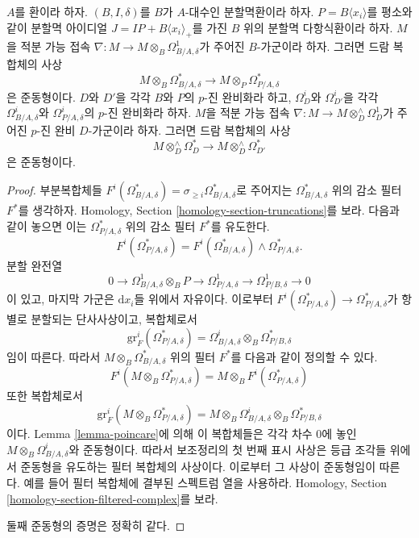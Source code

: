 \begin{lemma}
\label{lemma-relative-poincare}
$A$를 환이라 하자. $(B, I, \delta)$를 $B$가 $A$-대수인 분할멱환이라
하자. $P = B\langle x_i \rangle$를 평소와 같이 분할멱 아이디얼
$J = IP + B\langle x_i \rangle_{+}$를 가진 $B$ 위의 분할멱
다항식환이라 하자. $M$을 적분 가능 접속
$\nabla : M \to M \otimes_B \Omega^1_{B/A, \delta}$가 주어진
$B$-가군이라 하자. 그러면 드람 복합체의 사상
$$
M \otimes_B \Omega^*_{B/A, \delta}
\longrightarrow
M \otimes_P \Omega^*_{P/A, \delta}
$$
은 준동형이다. $D$와 $D'$을 각각 $B$와 $P$의 $p$-진 완비화라
하고, $\Omega^i_D$와 $\Omega^i_{D'}$을 각각
$\Omega^i_{B/A, \delta}$와 $\Omega^i_{P/A, \delta}$의 $p$-진
완비화라 하자. $M$을
적분 가능 접속 $\nabla : M \to M \otimes^\wedge_D \Omega^1_D$가
주어진 $p$-진 완비 $D$-가군이라 하자. 그러면 드람 복합체의 사상
$$
M \otimes^\wedge_D \Omega^*_D
\longrightarrow
M \otimes^\wedge_D \Omega^*_{D'}
$$
은 준동형이다.
\end{lemma}

\begin{proof}
부분복합체들
$F^i(\Omega^*_{B/A, \delta}) = \sigma_{\geq i}\Omega^*_{B/A, \delta}$로
주어지는 $\Omega^*_{B/A, \delta}$ 위의 감소 필터 $F^*$를 생각하자.
Homology, Section \ref{homology-section-truncations}를 보라. 다음과
같이 놓으면 이는 $\Omega^*_{P/A, \delta}$ 위의 감소 필터 $F^*$를
유도한다.
$$
F^i(\Omega^*_{P/A, \delta}) =
F^i(\Omega^*_{B/A, \delta}) \wedge \Omega^*_{P/A, \delta}.
$$
분할 완전열
$$
0 \to \Omega^1_{B/A, \delta} \otimes_B P \to
\Omega^1_{P/A, \delta} \to
\Omega^1_{P/B, \delta} \to 0
$$
이 있고, 마지막 가군은 $\text{d}x_i$들 위에서 자유이다. 이로부터
$F^i(\Omega^*_{P/A, \delta}) \to \Omega^*_{P/A, \delta}$가 항별로
분할되는 단사사상이고, 복합체로서
$$
\text{gr}^i_F(\Omega^*_{P/A, \delta}) =
\Omega^i_{B/A, \delta} \otimes_B \Omega^*_{P/B, \delta}
$$
임이 따른다. 따라서
$M \otimes_B \Omega^*_{B/A, \delta}$ 위의 필터 $F^*$를 다음과 같이
정의할 수 있다.
$$
F^i(M \otimes_B \Omega^*_{P/A, \delta}) =
M \otimes_B F^i(\Omega^*_{P/A, \delta})
$$
또한 복합체로서
$$
\text{gr}^i_F(M \otimes_B \Omega^*_{P/A, \delta}) =
M \otimes_B \Omega^i_{B/A, \delta} \otimes_B \Omega^*_{P/B, \delta}
$$
이다. Lemma \ref{lemma-poincare}에 의해 이 복합체들은 각각 차수
$0$에 놓인 $M \otimes_B \Omega^i_{B/A, \delta}$와 준동형이다.
따라서 보조정리의 첫 번째 표시 사상은 등급 조각들 위에서
준동형을 유도하는 필터 복합체의 사상이다. 이로부터 그 사상이
준동형임이 따른다. 예를 들어 필터 복합체에 결부된 스펙트럼 열을
사용하라. Homology, Section \ref{homology-section-filtered-complex}를
보라.

\medskip\noindent
둘째 준동형의 증명은 정확히 같다.
\end{proof}



